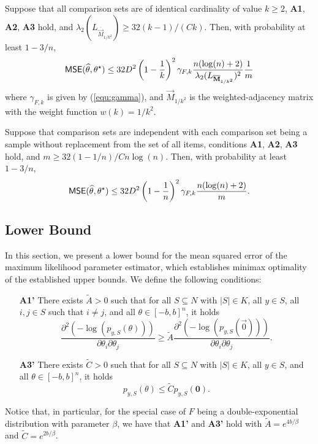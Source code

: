 \begin{corollary} Suppose that all comparison sets are of identical cardinality of value $k\geq 2$, {\bf A1}, {\bf A2}, {\bf A3} hold, and $\lambda_2(L_{\overline{\vec{M}}_{1/k^2}}) \geq 32(k-1)/(C k)$. Then, with probability at least $1-3/n$,
$$
\hbox{\textup{\textsf{MSE}}}(\widehat{\theta},\theta^\star) \le 
32 D^2 \left(1-\frac{1}{k}\right)^2\gamma_{F,k}\frac{n(\log(n)+2)}{\lambda_2(L_{\overline{\mathbf{M}}_{1/k^2}})^2}\frac{1}{m}
$$
where $\gamma_{F,k}$ is given by (\ref{equ:gamma}), and $\vec{M}_{1/k^2}$ is the weighted-adjacency matrix with the weight function $w(k) = 1/k^2$.
\end{corollary}

\begin{corollary} Suppose that comparison sets are independent with each comparison set being a sample without replacement from the set of all items, conditions {\bf A1}, {\bf A2}, {\bf A3} hold, and $m \geq 32(1-1/n)/C n \log(n)$. Then, with probability at least $1-3/n$,
$$
\hbox{\textup{\textsf{MSE}}}(\widehat{\theta},\theta^\star) \le 
32 D^2 \left(1-\frac{1}{n}\right)^2\gamma_{F,k} \frac{n(\log(n)+2)}{m}.
$$
\label{cor:ksize}
\end{corollary}


\subsection{Lower Bound}

In this section, we present a lower bound for the mean squared error of the maximum likelihood parameter estimator, which establishes minimax optimality of the established upper bounds. We define the following conditions:
\begin{itemize}
\item[{\bf A1'}] There exists $\widetilde{A} > 0$ such that for all $S\subseteq N$ with $|S|\in K$, all $y\in S$, all $i,j\in S$ such that $i\neq j$, and all $\theta\in [-b,b]^n$, it holds
$$
\frac{\partial^2 (-\log(p_{y,S}(\theta)))}{\partial \theta_i \partial \theta_j} \geq \widetilde{A}\frac{\partial^2 (-\log(p_{y,S}(\vec{0})))}{\partial \theta_i \partial \theta_j}.
$$

\item[{\bf A3'}] There exists $\widetilde{C} > 0$ such that for all $S\subseteq N$ with $|S|\in K$, all $y\in S$, and all $\theta \in [-b,b]^n$, it holds
$$
p_{y,S}(\theta) \leq \widetilde{C} p_{y,S}({\bm 0}). 
$$
\end{itemize}

Notice that, in particular, for the special case of $F$ being a double-exponential distribution with parameter $\beta$, we have that {\bf A1'} and {\bf A3'} hold with $\widetilde{A} = e^{4b/\beta}$ and $\widetilde{C} = e^{2b/\beta}$.

